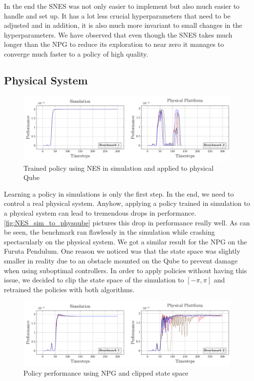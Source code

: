 In the end the SNES was not only easier to implement but also much easier to handle and set up. It has a lot less crucial hyperparameters that need to be adjusted and in addition, it is also much more invariant to small changes in the hyperparameters. We have observed that even though the SNES takes much longer than the NPG to reduce its exploration to near zero it manages to converge much faster to a policy of high quality.

\subsection{Physical System}
\label{phys}
\vspace{-.8cm}
\begin{figure}[ht]
\centering
\includegraphics[scale=.5]{plots/nes_on_rr_master.pdf}
\caption{Trained policy using NES in simulation and applied to physical Qube}
\label{fig:NES_sim_to_physqube}
\end{figure}

Learning a policy in simulations is only the first step. In the end, we need to control a real physical system. Anyhow, applying a policy trained in simulation to a physical system can lead to tremendous drops in performance. \autoref{fig:NES_sim_to_physqube} pictures this drop in performance really well. As can be seen, the benchmark ran flawlessly in the simulation while crashing spectacularly on the physical system. We got a similar result for the NPG on the Furuta Pendulum. One reason we noticed was that the state space was slightly smaller in reality due to an obstacle mounted on the Qube to prevent damage when using suboptimal controllers. In order to apply policies without having this issue, we decided to clip the state space of the simulation to $[-\pi, \pi]$ and retrained the policies with both algorithms.

\begin{figure}[ht]
\centering
\includegraphics[scale=.5]{plots/npg_on_rr_master.pdf}
\caption{Policy performance using NPG and clipped state space}
\label{fig:NPG_sim_to_physqube}
\end{figure}

